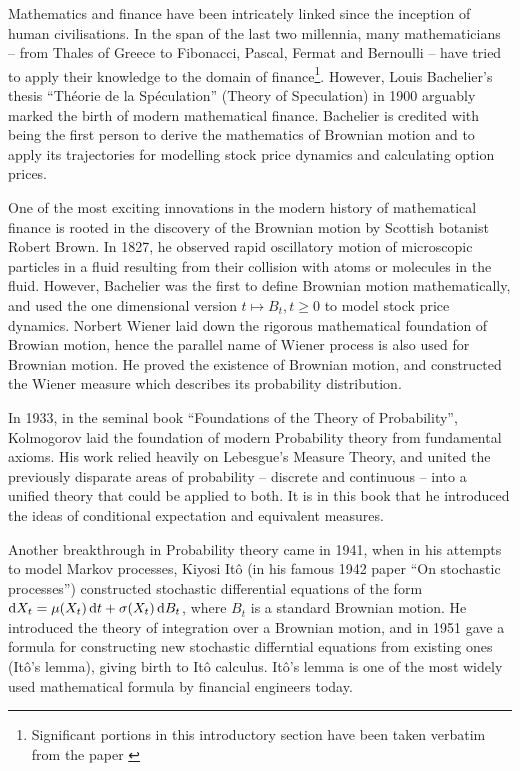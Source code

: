 

Mathematics and finance have been intricately linked since the inception of human civilisations. In the span of the last two millennia, many mathematicians -- from Thales of Greece to Fibonacci, Pascal, Fermat and Bernoulli -- have tried to apply their knowledge to the domain of finance\footnote{Significant portions in this introductory section have been taken verbatim from the paper \cite{Akyildirim2014}}. However, Louis Bachelier's thesis “Théorie de la Spéculation” (Theory of Speculation) in 1900 arguably marked the birth of modern mathematical finance. Bachelier is credited with being the first person to derive the mathematics of Brownian motion and to apply its trajectories for modelling stock price dynamics and calculating option prices.

One of the most exciting innovations in the modern history of mathematical finance is rooted in the discovery of the Brownian motion by Scottish botanist Robert Brown. In 1827, he observed rapid oscillatory motion of microscopic particles in a fluid resulting from their collision with atoms or molecules in the fluid. However, Bachelier was the first to define Brownian motion mathematically, and used the one dimensional version $ t \mapsto B_t, t \ge 0 $ to model stock price dynamics. Norbert Wiener laid down the rigorous mathematical foundation of Browian motion, hence the parallel name of Wiener process is also used for Brownian motion. He proved the existence of Brownian motion, and constructed the Wiener measure which describes its probability distribution.

In 1933, in the seminal book “Foundations of the Theory of Probability”, Kolmogorov laid the foundation of modern Probability theory from fundamental axioms. His work relied heavily on Lebesgue's Measure Theory, and united the previously disparate areas of probability -- discrete and continuous -- into a unified theory that could be applied to both. It is in this book that he introduced the ideas of conditional expectation and equivalent measures.

Another breakthrough in Probability theory came in 1941, when in his attempts to model Markov processes, Kiyosi Itô (in his famous 1942 paper “On stochastic processes”) constructed stochastic differential equations of the form $ \dif X_t = \mu(X_t) \dif t + \sigma(X_t) \dif B_t $, where $ B_t $ is a standard Brownian motion. He introduced the theory of integration over a Brownian motion, and in 1951 gave a formula for constructing new stochastic differntial equations from existing ones (Itô's lemma), giving birth to Itô calculus. Itô's lemma is one of the most widely used mathematical formula by financial engineers today.

